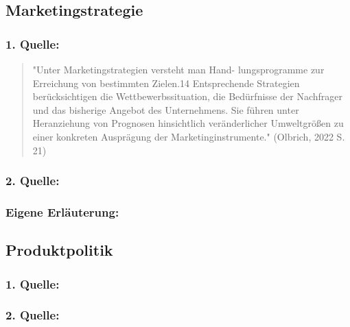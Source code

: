     \subsection{Marketingstrategie}
        \subsubsection*{1. Quelle:}
        \begin{abstract}
            \noindent "Unter Marketingstrategien versteht man Hand-
            lungsprogramme zur Erreichung von bestimmten Zielen.14 Entsprechende
            Strategien berücksichtigen die Wettbewerbssituation, die Bedürfnisse der
            Nachfrager und das bisherige Angebot des Unternehmens. Sie führen unter
            Heranziehung von Prognosen hinsichtlich veränderlicher Umweltgrößen zu
            einer konkreten Ausprägung der Marketinginstrumente." (Olbrich, 2022 S. 21)
        \end{abstract}
        \subsubsection*{2. Quelle:}
        \begin{abstract}
        \end{abstract}
        \subsubsection*{Eigene Erläuterung:}
        \begin{abstract}
        \end{abstract}
    \subsection{Produktpolitik}
        \subsubsection*{1. Quelle:}
        \begin{abstract}
            
        \end{abstract}
        \subsubsection*{2. Quelle:}
        \begin{abstract}
        \end{abstract}
